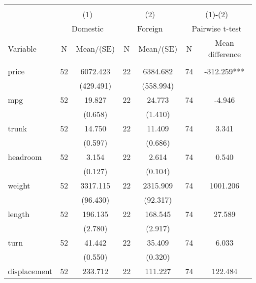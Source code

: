 
\begin{tabular}{@{\extracolsep{5pt}}lcccccc}
\\[-1.8ex]\hline \hline \\[-1.8ex]
 & \multicolumn{2}{c}{(1)}  & \multicolumn{2}{c}{(2)}  & \multicolumn{2}{c}{(1)-(2)} \\
 & \multicolumn{2}{c}{Domestic}  & \multicolumn{2}{c}{Foreign}  & \multicolumn{2}{c}{Pairwise t-test}  \\
Variable & N & Mean/(SE) & N & Mean/(SE) & N & Mean difference \\ \hline \\[-1.8ex] 
price   & 52    & 6072.423    & 22    & 6384.682    & 74    & -312.259***   \\
 &   & (429.491)  &   & (558.994)  &   &  \\ [1ex]
mpg   & 52    & 19.827    & 22    & 24.773    & 74    & -4.946   \\
 &   & (0.658)  &   & (1.410)  &   &  \\ [1ex]
trunk   & 52    & 14.750    & 22    & 11.409    & 74    & 3.341   \\
 &   & (0.597)  &   & (0.686)  &   &  \\ [1ex]
headroom   & 52    & 3.154    & 22    & 2.614    & 74    & 0.540   \\
 &   & (0.127)  &   & (0.104)  &   &  \\ [1ex]
weight   & 52    & 3317.115    & 22    & 2315.909    & 74    & 1001.206   \\
 &   & (96.430)  &   & (92.317)  &   &  \\ [1ex]
length   & 52    & 196.135    & 22    & 168.545    & 74    & 27.589   \\
 &   & (2.780)  &   & (2.917)  &   &  \\ [1ex]
turn   & 52    & 41.442    & 22    & 35.409    & 74    & 6.033   \\
 &   & (0.550)  &   & (0.320)  &   &  \\ [1ex]
displacement   & 52    & 233.712    & 22    & 111.227    & 74    & 122.484   \\

\end{tabular}
